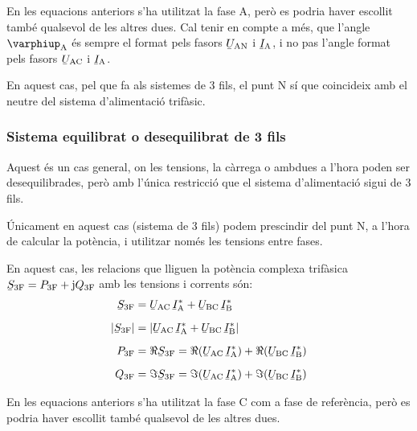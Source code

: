 En les equacions anteriors s'ha utilitzat la fase A, però es
podria haver escollit també qualsevol de les altres dues. Cal tenir
en compte a més, que l'angle $\varphiup\ped{A}$ és sempre el format
pels fasors $\cmplx{U}\ped{AN}$ i $\cmplx{I}\ped{A}$, i no pas
l'angle format pels fasors $\cmplx{U}\ped{AC}$ i
$\cmplx{I}\ped{A}$.

En aquest cas, pel que fa als sistemes de 3 fils,  el punt N sí
que coincideix amb el neutre del sistema d'alimentació trifàsic.

\subsubsection{Sistema equilibrat o desequilibrat de 3 fils}

Aquest és un cas  general, on les tensions, la càrrega o ambdues a
l'hora  poden ser desequilibrades, però amb l'única restricció que
el sistema d'alimentació sigui de 3 fils.

 Únicament en aquest cas (sistema de 3 fils) podem prescindir del punt N, a l'hora de
calcular la potència, i utilitzar només les tensions entre fases.

En aquest cas, les relacions que lliguen la potència complexa
trifàsica $\cmplx{S}\ped{3F} = P\ped{3F} + \ju Q\ped{3F}$ amb les
tensions i corrents són:
\begin{align}
    \cmplx{S}\ped{3F} &= \cmplx{U}\ped{AC} \,\cmplx{I}\ped{A}^*
     +  \cmplx{U}\ped{BC} \,\cmplx{I}\ped{B}^*  \label{eq:s_3f_3fils}\\[2mm]
    |\cmplx{S}\ped{3F}| &= |\cmplx{U}\ped{AC}\, \cmplx{I}\ped{A}^* +
    \cmplx{U}\ped{BC}\, \cmplx{I}\ped{B}^*| \\[2mm]
    P\ped{3F} &= \Re\cmplx{S}\ped{3F}= \Re(\cmplx{U}\ped{AC}\, \cmplx{I}\ped{A}^*) +
    \Re(\cmplx{U}\ped{BC}\, \cmplx{I}\ped{B}^*) \\[2mm]
    Q\ped{3F} &= \Im\cmplx{S}\ped{3F}=\Im(\cmplx{U}\ped{AC} \,\cmplx{I}\ped{A}^*) +
    \Im(\cmplx{U}\ped{BC} \,\cmplx{I}\ped{B}^*)
\end{align}

En les equacions anteriors s'ha utilitzat la fase C com a
fase de referència, però es podria haver escollit també qualsevol de
les altres dues.

